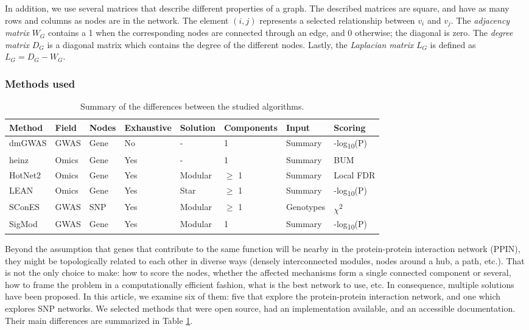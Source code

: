 \documentclass[twocolumn, 10pt]{article}
\begin{document}
In addition, we use several matrices that describe different properties of a graph. The described matrices are square, and have as many rows and columns as nodes are in the network. The element $(i,j)$ represents a  selected relationship between $v_{i}$ and $v_{j}$. The \emph{adjacency matrix} $W_{G}$ contains a 1 when the corresponding nodes are connected through an edge, and 0 otherwise; the diagonal is zero. The \emph{degree matrix} $D_{G}$ is a diagonal matrix which contains the degree of the different nodes. Lastly, the \emph{Laplacian matrix} $L_{G}$ is defined as $L_{G} = D_{G} - W_{G}$.

\subsubsection{Methods used}
\label{methods:methods}
\begin{table}[htbp]
\caption{\label{tab:method_comparison}
Summary of the differences between the studied algorithms.}
\centering
\begin{tabular}{l|lllllll}
Method & Field & Nodes & Exhaustive & Solution & Components & Input & Scoring\\
\hline
dmGWAS & GWAS & Gene & No & - & 1 & Summary & -log\textsubscript{10}(P)\\
heinz & Omics & Gene & Yes & - & 1 & Summary & BUM\\
HotNet2 & Omics & Gene & Yes & Modular & \(\ge\) 1 & Summary & Local FDR\\
LEAN & Omics & Gene & Yes & Star & \(\ge\) 1 & Summary & -log\textsubscript{10}(P)\\
SConES & GWAS & SNP & Yes & Modular & \(\ge\) 1 & Genotypes & \(\chi\)\textsuperscript{2}\\
SigMod & GWAS & Gene & Yes & Modular & 1 & Summary & -log\textsubscript{10}(P)\\
\end{tabular}
\end{table}

Beyond the assumption that genes that contribute to the same function will be nearby in the protein-protein interaction network (PPIN), they might be topologically related to each other in diverse ways (densely interconnected modules, nodes around a hub, a path, etc.). That is not the only choice to make: how to score the nodes, whether the affected mechanisms form a single connected component or several, how to frame the problem in a computationally efficient fashion, what is the best network to use, etc. In consequence, multiple solutions have been proposed. In this article, we examine six of them: five that explore the protein-protein interaction network, and one which explores SNP networks. We selected methods that were open source, had an implementation available, and an accessible documentation. Their main differences are summarized in Table \ref{tab:method_comparison}.
\end{document}
